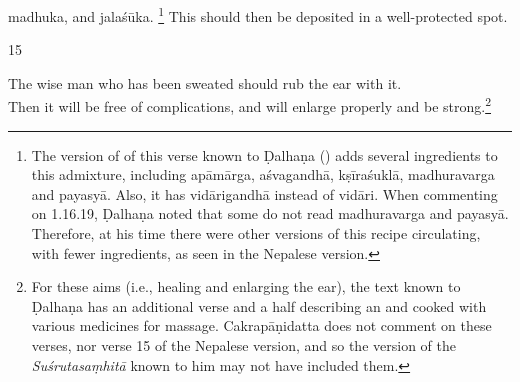 \begin{translation}
        \gls{madhuka}, %
        and \gls{jalaśūka}.%
        \footnote{The version of of this verse known to Ḍalhaṇa ()
            adds several ingredients to this admixture, including \gls{apāmārga},
            \gls{aśvagandhā}, \gls{kṣīraśuklā}, \gls{madhuravarga} and \gls{payasyā}.
            Also, it has \gls{vidārigandhā} instead of \gls{vidāri}. When commenting
            on 1.16.19, Ḍalhaṇa \citep[79]{vulgate} noted that some do not read
            \gls{madhuravarga} and \gls{payasyā}. Therefore, at his time there were
            other versions of this recipe circulating, with fewer ingredients, as seen
            in the Nepalese version.}
            This should then be deposited in a well-protected spot.
    
    
\item[15]%
    \begin{sloka}
The wise man who has been sweated should rub the  
ear with
it.\\ Then it will be free of complications, and will enlarge properly and be
strong.\footnote{For these aims (i.e., healing and enlarging the ear), the text
    known to Ḍalhaṇa \citep[79]{vulgate} has an additional verse and a half describing
    an  and 
     cooked
    with various medicines for massage. Cakrapāṇidatta \citep[131]{acar-1939} does not
    comment on these verses, nor verse 15 of the Nepalese version, and so the version
    of the \emph{Suśrutasaṃhitā} known to him may not have included them.}
    \end{sloka}
    

\end{translation}
